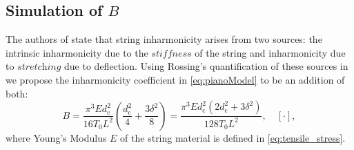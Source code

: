 \documentclass{article}
\begin{document}
\begin{sloppy}
\subsection{Simulation of $B$}%
The authors of \cite{coltShank} state that string inharmonicity arises from two sources: the intrinsic inharmonicity due to the $\textit{stiffness}$ of the string and inharmonicity due to $\textit{stretching}$ due to deflection. Using Rossing's quantification of these sources in \cite{rossing:science_of_string_instruments} we propose the inharmonicity coefficient in \eqref{eq:pianoModel} to be an addition of both:
\begin{equation}\label{eq:totalInharmonicity}
    B =  \frac {\pi^3 E d_\text{c}^2}{16 T_0 L^2}\left(\frac {d_\text{c}^2}{4}   +  \frac {3\delta^2}{8} \right)  =  \frac{\pi^3 E d_\text{c}^2(2d_\text{c}^2 + 3\delta^2)}{128 T_0 L^2},\quad [\cdot],
\end{equation}
where Young's Modulus $E$ of the string material is defined in \eqref{eq:tensile_stress}.
%
%

\end{sloppy}
\end{document}
